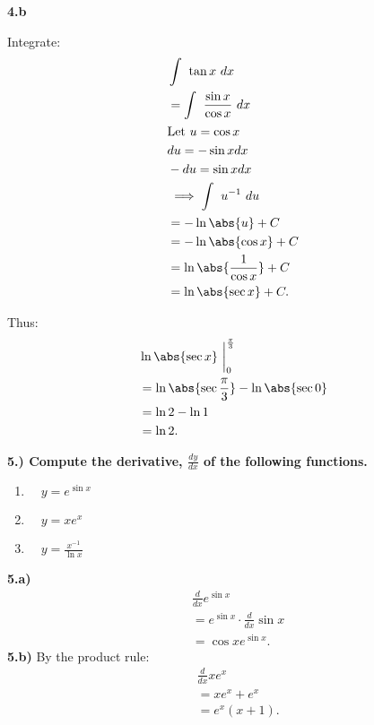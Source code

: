 \documentclass{report}
\begin{document}
    \bigbreak \noindent 
    \textbf{4.b}
    \bigbreak \noindent 
    \begin{minipage}[t]{0.47\textwidth}
        Integrate:
    \begin{align*}
        &\int_{}^{}\ \tan{x}\ dx \\
        &=\int_{}^{}\ \frac{\sin{x}}{\cos{x}}\ dx \\
        &\text{Let $u=\cos{x}$} \\
        &du=-\sin{x}dx\\
        &-du = \sin{x}dx \\
        &\implies \int_{}^{}\ u^{-1}\ du \\
        &=-\ln{\abs{u}} + C \\
        &= -\ln{\abs{\cos{x}}} + C \\
        &= \ln{\abs{\frac{1}{\cos{x}}}}  + C\\
        &= \ln{\abs{\sec{x}}} + C
    .\end{align*}
    \end{minipage}
    \begin{minipage}[t]{0.47\textwidth}
        Thus:
        \begin{align*}
           &\ln{\abs{\sec{x}}}\ \bigg|_0^{\frac{\pi}{3}} \\
           &=\ln{\abs{\sec{\frac{\pi}{3}}}}  - \ln{\abs{\sec{0}}} \\
           &= \ln{2} - \ln{1} \\
           &= \ln{2}
        .\end{align*}
    \end{minipage}

    \pagebreak \bigbreak \noindent 
    \begin{mdframed}
        \textbf{5.) Compute the derivative,  $\frac{dy}{dx}$  of the following functions.}
            \begin{enumerate}[label=(\alph*)]
                \item $\quad y = e^{\sin x}$ 
                \item $\quad y = x e^x$ 
                \item $\quad y = \frac{x^{-1}}{\ln x}$
            \end{enumerate}
    \end{mdframed}
    \bigbreak \noindent 
    \textbf{5.a)}
    \begin{align*}
        &\frac{d}{dx}e^{\sin{x}} \\
        &=e^{\sin{x}} \cdot \frac{d}{dx} \sin{x} \\
        &= \cos{x}e^{\sin{x}}
    .\end{align*}
    \bigbreak \noindent 
    \textbf{5.b)}
    \bigbreak \noindent 
    By the product rule:
    \begin{align*}
       &\frac{d}{dx} xe^{x} \\
       &=xe^{x}+e^{x} \\
       &=e^{x}(x+1)
    .\end{align*}
\end{document}
